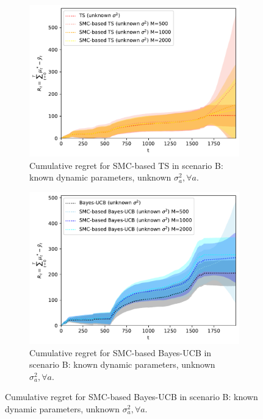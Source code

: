 \begin{figure}[!h]
	\begin{subfigure}[b]{0.45\textwidth}
		\includegraphics[width=\textwidth]{./fods_figs/dynamic/linearGaussian/b_selectedM_cumulative_regret_dknown_ts_unknownsigma}
		\caption{Cumulative regret for SMC-based TS in scenario B: known dynamic parameters, unknown $\sigma_a^2, \forall a$.}
		\label{fig:dynamic_bandits_linearGaussian_b_ts_dknown_unknownsigma_M}
	\end{subfigure}\qquad
	\begin{subfigure}[b]{0.45\textwidth}
		\includegraphics[width=\textwidth]{./fods_figs/dynamic/linearGaussian/b_selectedM_cumulative_regret_dknown_bucb_unknownsigma}
		\caption{Cumulative regret for SMC-based Bayes-UCB in scenario B: known dynamic parameters, unknown $\sigma_a^2, \forall a$.}
		\label{fig:dynamic_bandits_linearGaussian_b_bucb_dknown_unknownsigma_M}
	\end{subfigure}
	

\end{figure}
